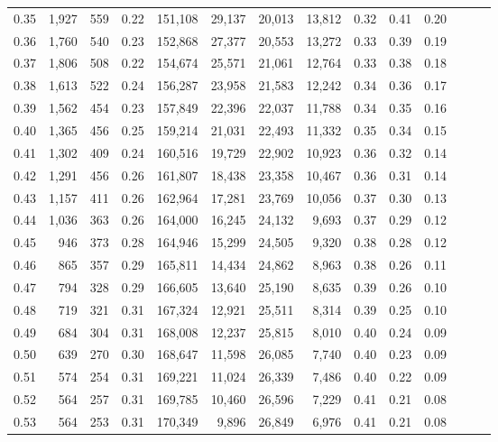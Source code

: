 \begin{tabular}{rrrrrrrrrrrrrr}
0.35 &  1,927 &  559 &  0.22 &  151,108 &   29,137 &  20,013 &  13,812 &  0.32 &  0.41 &      0.20 \\
0.36 &  1,760 &  540 &  0.23 &  152,868 &   27,377 &  20,553 &  13,272 &  0.33 &  0.39 &      0.19 \\
0.37 &  1,806 &  508 &  0.22 &  154,674 &   25,571 &  21,061 &  12,764 &  0.33 &  0.38 &      0.18 \\
0.38 &  1,613 &  522 &  0.24 &  156,287 &   23,958 &  21,583 &  12,242 &  0.34 &  0.36 &      0.17 \\
0.39 &  1,562 &  454 &  0.23 &  157,849 &   22,396 &  22,037 &  11,788 &  0.34 &  0.35 &      0.16 \\
0.40 &  1,365 &  456 &  0.25 &  159,214 &   21,031 &  22,493 &  11,332 &  0.35 &  0.34 &      0.15 \\
0.41 &  1,302 &  409 &  0.24 &  160,516 &   19,729 &  22,902 &  10,923 &  0.36 &  0.32 &      0.14 \\
0.42 &  1,291 &  456 &  0.26 &  161,807 &   18,438 &  23,358 &  10,467 &  0.36 &  0.31 &      0.14 \\
0.43 &  1,157 &  411 &  0.26 &  162,964 &   17,281 &  23,769 &  10,056 &  0.37 &  0.30 &      0.13 \\
0.44 &  1,036 &  363 &  0.26 &  164,000 &   16,245 &  24,132 &   9,693 &  0.37 &  0.29 &      0.12 \\
0.45 &    946 &  373 &  0.28 &  164,946 &   15,299 &  24,505 &   9,320 &  0.38 &  0.28 &      0.12 \\
0.46 &    865 &  357 &  0.29 &  165,811 &   14,434 &  24,862 &   8,963 &  0.38 &  0.26 &      0.11 \\
0.47 &    794 &  328 &  0.29 &  166,605 &   13,640 &  25,190 &   8,635 &  0.39 &  0.26 &      0.10 \\
0.48 &    719 &  321 &  0.31 &  167,324 &   12,921 &  25,511 &   8,314 &  0.39 &  0.25 &      0.10 \\
0.49 &    684 &  304 &  0.31 &  168,008 &   12,237 &  25,815 &   8,010 &  0.40 &  0.24 &      0.09 \\
0.50 &    639 &  270 &  0.30 &  168,647 &   11,598 &  26,085 &   7,740 &  0.40 &  0.23 &      0.09 \\
0.51 &    574 &  254 &  0.31 &  169,221 &   11,024 &  26,339 &   7,486 &  0.40 &  0.22 &      0.09 \\
0.52 &    564 &  257 &  0.31 &  169,785 &   10,460 &  26,596 &   7,229 &  0.41 &  0.21 &      0.08 \\
0.53 &    564 &  253 &  0.31 &  170,349 &    9,896 &  26,849 &   6,976 &  0.41 &  0.21 &      0.08 \\

\end{tabular}
